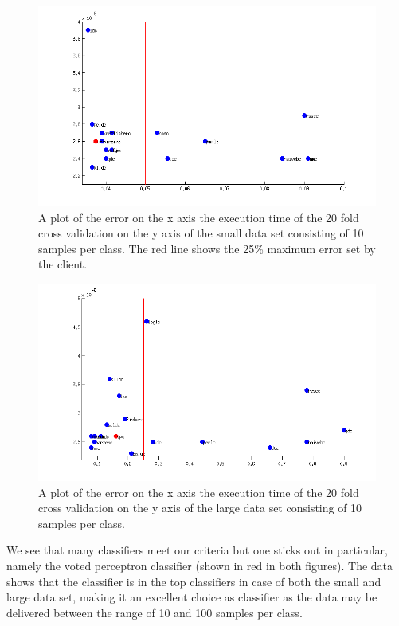 \documentclass[%
        compressed,
        final,
        notitlepage,
        narroweqnarray,
        inline,
        twoside,
        ]{ieee}
\begin{document}
\begin{figure}
    \includegraphics[width=\columnwidth]{images/large_data_set_all_classifiers_tested3.png}
    \caption{A plot of the error on the x axis the execution time of the 20 fold
    cross validation on the y axis of the small data set consisting of 10
    samples per class. The red line shows the 25\% maximum error set by the client.}
\end{figure}
    
\begin{figure}
    \includegraphics[width=\columnwidth]{images/small_data_set_all_classifiers_tested3.png}
    \caption{A plot of the error on the x axis the execution time of the 20 fold
    cross validation on the y axis of the large data set consisting of 10
samples per class. }
\end{figure}


We see that many classifiers meet our criteria but one sticks out in particular, namely the voted perceptron classifier (shown in red in both figures). The data shows that the classifier is in the top classifiers in case of both the small and large data set, making it an excellent choice as classifier as the data may be delivered between the range of 10 and 100 samples per class.
\end{document}
